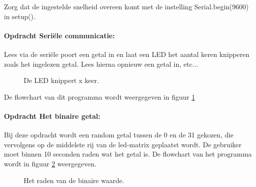 Zorg dat de ingestelde snelheid overeen komt met de instelling \textcolor{BurntOrange}{Serial.begin}(9600) in  \textcolor{OliveGreen}{setup}(). 


\paragraph{Opdracht Seriële communicatie:} \label{blad:aantalknipper}
Lees via de seriële poort een getal in en laat een LED het aantal keren knipperen zoals het ingelezen getal. Lees hierna opnieuw een getal in, etc...
\begin{figure}[H]
	\captionsetup{justification=centering}
	\centering
	\eerstefc

	\caption{De LED knippert x keer.}
	\label{fig:flowchart1}
\end{figure}
De flowchart van dit programma wordt weergegeven in figuur \ref{fig:flowchart1}

\paragraph{Opdracht Het binaire getal:} \label{blz:bineairGetal}
Bij deze opdracht wordt een random getal tussen de 0 en de 31 gekozen, die vervolgens op de middelste rij van de led-matrix geplaatst wordt. De gebruiker moet binnen 10 seconden raden wat het getal is. De flowchart van het programma wordt in figuur \ref{fig:flowchart2} weergegeven.
\begin{figure}[H]
	\captionsetup{justification=centering}
	\centering
	\randomfc
	
	\caption{Het raden van de binaire waarde.}
	\label{fig:flowchart2}
\end{figure}

